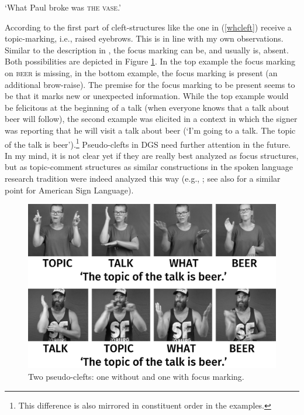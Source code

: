 \begin{exe}
\ex {} 
\glt `What Paul broke was \textsc{the vase}.' \label{whcleft}
\end{exe}

\noindent According to \citet[397]{happ2014vork} the first part of cleft-structures like the one in (\ref{whcleft}) receive a topic-marking, i.e., raised eyebrows. This is in line with my own observations. Similar to the description in \citet[397]{happ2014vork}, the focus marking can be, and usually is, absent. Both possibilities are depicted in Figure \ref{pseudocleft}. In the top example the focus marking on \textsc{beer} is missing, in the bottom example, the focus marking is present (an additional brow-raise). The premise for the focus marking to be present seems to be that it marks new or unexpected information. While the top example would be felicitous at the beginning of a talk (when everyone knows that a talk about beer will follow), the second example was elicited in a context in which the signer was reporting that he will visit a talk about beer (`I'm going to a talk. The topic of the talk is beer').\footnote{This difference is also mirrored in constituent order in the examples.} Pseudo-clefts in DGS need further attention in the future. In my mind, it is not clear yet if they are really best analyzed as focus structures, but as topic-comment structures as similar constructions in the spoken language research tradition were indeed analyzed this way (e.g., \citealt{prince1978,gast2014}; see also \citealt{caponigro2011ask} for a similar point for American Sign Language).

\begin{figure}[bt]
\centering
	\includegraphics[width=1.0\textwidth]{pseudoclefttwosw.jpg}
	\caption{Two pseudo-clefts: one without and one with focus marking.}
	\label{pseudocleft}
\end{figure}

